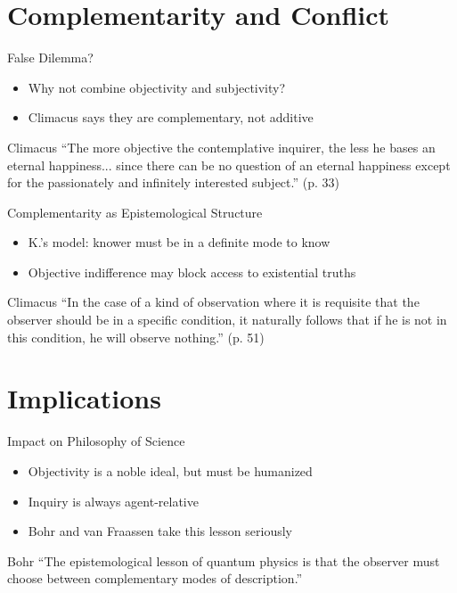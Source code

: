 \documentclass[12pt]{beamer}
\begin{document}
\section{Complementarity and Conflict}

\begin{frame}{False Dilemma?}
\begin{itemize}
  \item Why not combine objectivity and subjectivity?
  \item Climacus says they are complementary, not additive
\end{itemize}
\begin{block}{Climacus}
“The more objective the contemplative inquirer, the less he bases an eternal happiness... since there can be no question of an eternal happiness except for the passionately and infinitely interested subject.” (p. 33)
\end{block}
\end{frame}

\begin{frame}{Complementarity as Epistemological Structure}
\begin{itemize}
  \item K.’s model: knower must be in a definite mode to know
  \item Objective indifference may block access to existential truths
\end{itemize}
\begin{block}{Climacus}
“In the case of a kind of observation where it is requisite that the observer should be in a specific condition, it naturally follows that if he is not in this condition, he will observe nothing.” (p. 51)
\end{block}
\end{frame}

\section{Implications}

\begin{frame}{Impact on Philosophy of Science}
\begin{itemize}
  \item Objectivity is a noble ideal, but must be humanized
  \item Inquiry is always agent-relative
  \item Bohr and van Fraassen take this lesson seriously
\end{itemize}
\begin{block}{Bohr}
“The epistemological lesson of quantum physics is that the observer must choose between complementary modes of description.”
\end{block}
\end{frame}
\end{document}
